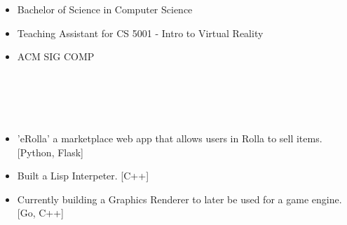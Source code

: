 \documentclass{article}
\begin{document}
\section{\\}
\color{black}
\begin{itemize}
\subsection{\large Missouri University of Science and Technology\hfill\mdseries Graduated May 2021}
\item Bachelor of Science in Computer Science
\item Teaching Assistant for CS 5001 - Intro to Virtual Reality
\item ACM SIG COMP
\end{itemize}
\color{blue}
\section{\\}
\color{black}
\begin{itemize}
  \item 'eRolla' a marketplace web app that allows users in Rolla to sell items. [Python, Flask]
  \item Built a Lisp Interpeter. [C++]
  \item Currently building a Graphics Renderer to later be used for a game engine. [Go, C++]
  \end{itemize}
\end{document}
